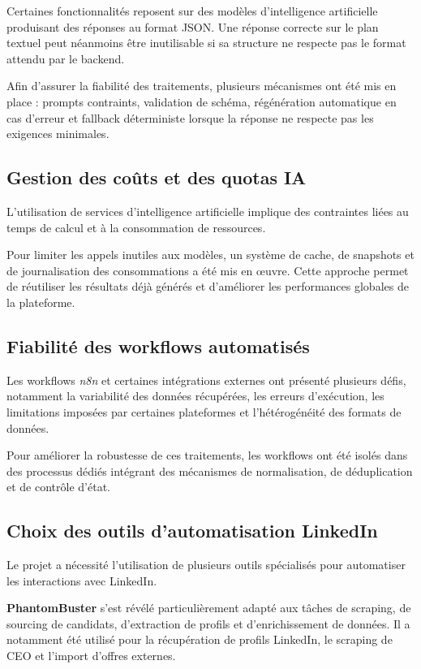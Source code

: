 Certaines fonctionnalités reposent sur des modèles d'intelligence artificielle produisant des réponses au format JSON. Une réponse correcte sur le plan textuel peut néanmoins être inutilisable si sa structure ne respecte pas le format attendu par le backend.

Afin d'assurer la fiabilité des traitements, plusieurs mécanismes ont été mis en place : prompts contraints, validation de schéma, régénération automatique en cas d'erreur et fallback déterministe lorsque la réponse ne respecte pas les exigences minimales.

\subsection{Gestion des coûts et des quotas IA}

L'utilisation de services d'intelligence artificielle implique des contraintes liées au temps de calcul et à la consommation de ressources.

Pour limiter les appels inutiles aux modèles, un système de cache, de snapshots et de journalisation des consommations a été mis en œuvre. Cette approche permet de réutiliser les résultats déjà générés et d'améliorer les performances globales de la plateforme.

\subsection{Fiabilité des workflows automatisés}

Les workflows \textit{n8n} et certaines intégrations externes ont présenté plusieurs défis, notamment la variabilité des données récupérées, les erreurs d'exécution, les limitations imposées par certaines plateformes et l'hétérogénéité des formats de données.

Pour améliorer la robustesse de ces traitements, les workflows ont été isolés dans des processus dédiés intégrant des mécanismes de normalisation, de déduplication et de contrôle d'état.

\subsection{Choix des outils d'automatisation LinkedIn}

Le projet a nécessité l'utilisation de plusieurs outils spécialisés pour automatiser les interactions avec LinkedIn.

\textbf{PhantomBuster} s'est révélé particulièrement adapté aux tâches de scraping, de sourcing de candidats, d'extraction de profils et d'enrichissement de données. Il a notamment été utilisé pour la récupération de profils LinkedIn, le scraping de CEO et l'import d'offres externes.


